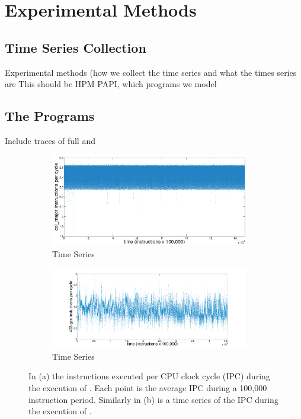 \section{Experimental Methods }

\subsection{Time Series Collection}
 Experimental methods (how we collect the time series and what the times series are
This should be HPM PAPI, which programs we model


\subsection{The Programs}
Include traces of full \col \svd and \gcc
\begin{figure}[htbp]
  \centering
  \begin{subfigure}[t]{0.475\textwidth}
    \includegraphics[width=0.95\textwidth]{figs/colFullTS}
    \caption{\col Time Series}
    \label{fig:col-ts}
  \end{subfigure}%
  \begin{subfigure}[t]{0.475\textwidth}
    \includegraphics[width=0.95\textwidth]{figs/gccfullts}
    \caption{\gcc Time Series}
    \label{fig:gcc-ts}
  \end{subfigure}
  \caption{In (a) the instructions executed per CPU clock cycle
    (IPC) during the execution of \col. Each point is the average IPC during a 100,000
    instruction period. Similarly in (b) is a time series of the IPC during the execution of \gcc.}\label{fig:sample-ts}
\end{figure}
